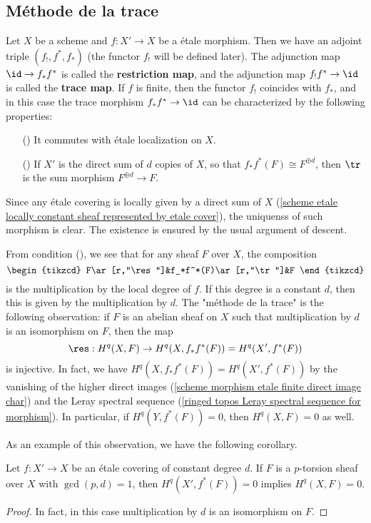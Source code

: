 \subsection{M\'ethode de la trace}
Let $X$ be a scheme and $f:X'\to X$ be a \'etale morphism. Then we have an adjoint triple $(f_!,f^*,f_*)$ (the functor $f_!$ will be defined later). The adjunction map $\id\to f_*f^*$ is called the \textbf{restriction map}, and the adjunction map $f_!f^*\to\id$ is called the \textbf{trace map}. If $f$ is finite, then the functor $f_!$ coincides with $f_*$, and in this case the trace morphism $f_*f^*\to\id$ can be characterized by the following properties:
\begin{enumerate}
    \item[(\rmnum{1})] It commutes with \'etale localization on $X$.
    \item[(\rmnum{2})] If $X'$ is the direct sum of $d$ copies of $X$, so that $f_*f^*(F)\cong F^{\oplus d}$, then $\tr$ is the sum morphism $F^{\oplus d}\to F$.
\end{enumerate}
Since any \'etale covering is locally given by a direct sum of $X$ (\cref{scheme etale locally constant sheaf represented by etale cover}), the uniquenss of such morphism is clear. The existence is ensured by the usual argument of descent.\par
From condition (), we see that for any sheaf $F$ over $X$, the composition
\[\begin{tikzcd}
F\ar[r,"\res"]&f_*f^*(F)\ar[r,"\tr"]&F
\end{tikzcd}\]
is the multiplication by the local degree of $f$. If this degree is a constant $d$, then this is given by the multiplication by $d$. The "m\'ethode de la trace" is the following observation: if $F$ is an abelian sheaf on $X$ such that multiplication by $d$ is an isomorphism on $F$, then the map
\[\res:H^q(X,F)\to H^q(X,f_*f^*(F))=H^q(X',f^*(F))\]
is injective. In fact, we have $H^q(X,f_*f^*(F))=H^q(X',f^*(F))$ by the vanishing of the higher direct images (\cref{scheme morphism etale finite direct image char}) and the Leray spectral sequence (\cref{ringed topos Leray spectral sequence for morphism}). In particular, if $H^q(Y,f^*(F))=0$, then $H^q(X,F)=0$ as well.\par
As an example of this observation, we have the following corollary.
\begin{corollary}\label{scheme p-torsion etale sheaf trace method}
Let $f:X'\to X$ be an \'etale covering of constant degree $d$. If $F$ is a $p$-torsion sheaf over $X$ with $\gcd(p,d)=1$, then $H^q(X',f^*(F))=0$ implies $H^q(X,F)=0$.
\end{corollary}
\begin{proof}
In fact, in this case multiplication by $d$ is an isomorphism on $F$.
\end{proof}

